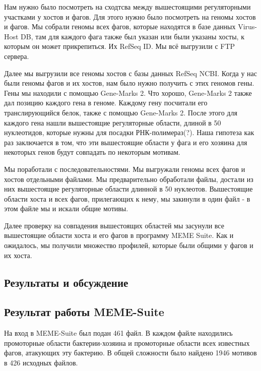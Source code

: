 \documentclass[14pt]{extarticle}
\begin{document}
\par{Нам нужно было посмотреть на сходтсва между вышестоящими регуляторными участками у хостов и фагов. Для этого нужно
было посмотреть на геномы хостов и фагов. Мы собрали геномы всех фагов, которые находятся в базе данных Virus-Host DB,
там для каждого фага также был указан или были указаны хосты, к которым он может прикрепиться. Их RefSeq ID. Мы всё
выгрузили с FTP сервера.}

\par{Далее мы выгрузили все геномы хостов с базы данных RefSeq NCBI. Когда у нас были геномы фагов и их хостов, нам было
нужно получить с этих геномов гены. Гены мы находили с помощью Gene-Marks 2. Что хорошо, Gene-Marks 2 также дал позицию
каждого гена в геноме. Каждому гену посчитали его транслирующийся белок, также с помощью Gene-Marks 2. После этого для
каждого гена нашли вышестоящие регуляторные области, длиной в 50 нуклеотидов, которые нужны для посадки 
РНК-полимераз(?).
Наша гипотеза как раз заключается в том, что эти вышестоящие области у фага и его хозяина для некоторых генов будут
совпадать по некоторым мотивам.}

\par{Мы поработали с последовательностями. Мы выгружали геномы всех фагов и хостов отдельными файлами. Мы предварительно
обработали файлы, достали из них вышестоящие регуляторные области длинной в 50 нуклеотов. Вышестоящие области хоста и
всех фагов, прилегающих к нему, мы закинули в один файл - в этом файле мы и искали общие мотивы.}

\par{Далее проверку на совпадения вышестоящих областей мы засунули все вышестоящие области хоста и его фагов в программу
MEME Suite. Как и ожидалось, мы получили множество профилей, которые были общими у фагов и их хоста. }

\newpage
\begin{center}
    \item \section{Результаты и обсуждение}
    \item \subsection{Результат работы MEME-Suite}
\end{center}

    
    \par{На вход в MEME-Suite был подан 461 файл. В каждом файле находились промоторные области бактерии-хозяина и 
    промоторные области всех известных \cite{virus-host} фагов, атакующих эту бактерию. В общей сложности было найдено 
    1946 мотивов в 426 исходных файлов.}
    
\end{document}
